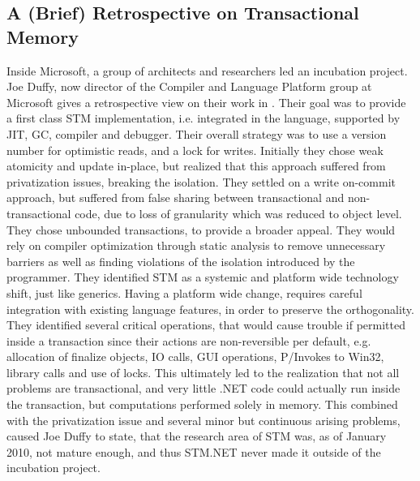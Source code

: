 \subsection{A (Brief) Retrospective on Transactional Memory}
Inside Microsoft, a group of architects and researchers led an incubation project. Joe Duffy, now director of the Compiler and Language Platform group at Microsoft gives a retrospective view on their work in \cite{duffy2010stmnet}. Their goal was to provide a first class \ac{STM} implementation, i.e. integrated in the language, supported by \ac{JIT}, \ac{GC}, compiler and debugger. Their overall strategy was to use a version number for optimistic reads, and a lock for writes. Initially they chose weak atomicity and update in-place, but realized that this approach suffered from privatization issues, breaking the isolation. They settled on a write on-commit approach, but suffered from false sharing between transactional and non-transactional code, due to loss of granularity which was reduced to object level. They chose unbounded transactions, to provide a broader appeal. They would rely on compiler optimization through static analysis to remove unnecessary barriers as well as finding violations of the isolation introduced by the programmer. They identified \ac{STM} as a systemic and platform wide technology shift, just like generics. Having a platform wide change, requires careful integration with existing language features, in order to preserve the orthogonality. They identified several critical operations, that would cause trouble if permitted inside a transaction since their actions are non-reversible per default, e.g. allocation of finalize objects, \ac{IO} calls, GUI operations, P/Invokes to Win32, library calls and use of locks. This ultimately led to the realization that not all problems are transactional, and very little .NET code could actually run inside the transaction, but computations performed solely in memory. This combined with the privatization issue and several minor but continuous arising problems, caused Joe Duffy to state, that the research area of \ac{STM} was, as of January 2010, not mature enough, and thus STM.NET never made it outside of the incubation project.


